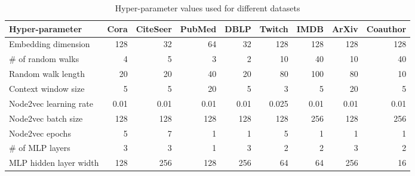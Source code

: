 \begin{table}
  \caption{Hyper-parameter values used for different datasets}
  \label{tab:hyperparameter-values}
  \centering
  \begin{tabular}{lrrrrrrrr}
    \toprule
    \textbf{Hyper-parameter} & \textbf{Cora} & \textbf{CiteSeer} & \textbf{PubMed} & \textbf{DBLP} & \textbf{Twitch} & \textbf{IMDB} & \textbf{ArXiv} & \textbf{Coauthor} \\
    \midrule
    Embedding dimension      & 128           & 32                & 64              & 32            & 128             & 128           & 128            & 128               \\
    \# of random walks       & 4             & 5                 & 3               & 2             & 10              & 40            & 10             & 40                \\
    Random walk length       & 20            & 20                & 40              & 20            & 80              & 100           & 80             & 10                \\
    Context window size      & 5             & 5                 & 20              & 5             & 3               & 5             & 20             & 5                 \\
    Node2vec learning rate   & 0.01          & 0.01              & 0.01            & 0.01          & 0.025           & 0.01          & 0.01           & 0.01              \\
    Node2vec batch size      & 128           & 128               & 128             & 128           & 128             & 256           & 128            & 256               \\
    Node2vec epochs          & 5             & 7                 & 1               & 1             & 5               & 1             & 1              & 1                 \\
    \# of MLP layers         & 3             & 3                 & 1               & 3             & 2               & 2             & 3              & 2                 \\
    MLP hidden layer width   & 128           & 256               & 128             & 256           & 64              & 64            & 256            & 16                \\

\end{tabular}
\end{table}
